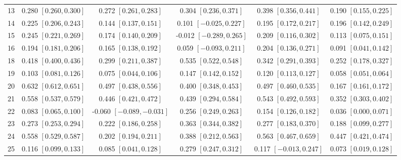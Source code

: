 \begin{landscape}
\begin{longtable}{lccccc}
13 & 0.280 {\scriptsize$[0.260,0.300]$} & 0.272 {\scriptsize$[0.261,0.283]$} & 0.304 {\scriptsize$[0.236,0.371]$} & 0.398 {\scriptsize$[0.356,0.441]$} & 0.190 {\scriptsize$[0.155,0.225]$} \\
14 & 0.225 {\scriptsize$[0.206,0.243]$} & 0.144 {\scriptsize$[0.137,0.151]$} & 0.101 {\scriptsize$[-0.025,0.227]$} & 0.195 {\scriptsize$[0.172,0.217]$} & 0.196 {\scriptsize$[0.142,0.249]$} \\
15 & 0.245 {\scriptsize$[0.221,0.269]$} & 0.174 {\scriptsize$[0.140,0.209]$} & -0.012 {\scriptsize$[-0.289,0.265]$} & 0.209 {\scriptsize$[0.116,0.302]$} & 0.113 {\scriptsize$[0.075,0.151]$} \\
16 & 0.194 {\scriptsize$[0.181,0.206]$} & 0.165 {\scriptsize$[0.138,0.192]$} & 0.059 {\scriptsize$[-0.093,0.211]$} & 0.204 {\scriptsize$[0.136,0.271]$} & 0.091 {\scriptsize$[0.041,0.142]$} \\
18 & 0.418 {\scriptsize$[0.400,0.436]$} & 0.299 {\scriptsize$[0.211,0.387]$} & 0.535 {\scriptsize$[0.522,0.548]$} & 0.342 {\scriptsize$[0.291,0.393]$} & 0.252 {\scriptsize$[0.178,0.327]$} \\
19 & 0.103 {\scriptsize$[0.081,0.126]$} & 0.075 {\scriptsize$[0.044,0.106]$} & 0.147 {\scriptsize$[0.142,0.152]$} & 0.120 {\scriptsize$[0.113,0.127]$} & 0.058 {\scriptsize$[0.051,0.064]$} \\
20 & 0.632 {\scriptsize$[0.612,0.651]$} & 0.497 {\scriptsize$[0.438,0.556]$} & 0.400 {\scriptsize$[0.348,0.453]$} & 0.497 {\scriptsize$[0.460,0.535]$} & 0.167 {\scriptsize$[0.161,0.172]$} \\
21 & 0.558 {\scriptsize$[0.537,0.579]$} & 0.446 {\scriptsize$[0.421,0.472]$} & 0.439 {\scriptsize$[0.294,0.584]$} & 0.543 {\scriptsize$[0.492,0.593]$} & 0.352 {\scriptsize$[0.303,0.402]$} \\
22 & 0.083 {\scriptsize$[0.065,0.100]$} & -0.060 {\scriptsize$[-0.089,-0.031]$} & 0.256 {\scriptsize$[0.249,0.263]$} & 0.154 {\scriptsize$[0.126,0.182]$} & 0.036 {\scriptsize$[0.000,0.071]$} \\
23 & 0.273 {\scriptsize$[0.253,0.294]$} & 0.222 {\scriptsize$[0.186,0.258]$} & 0.363 {\scriptsize$[0.344,0.382]$} & 0.277 {\scriptsize$[0.183,0.370]$} & 0.188 {\scriptsize$[0.099,0.277]$} \\
24 & 0.558 {\scriptsize$[0.529,0.587]$} & 0.202 {\scriptsize$[0.194,0.211]$} & 0.388 {\scriptsize$[0.212,0.563]$} & 0.563 {\scriptsize$[0.467,0.659]$} & 0.447 {\scriptsize$[0.421,0.474]$} \\
25 & 0.116 {\scriptsize$[0.099,0.133]$} & 0.085 {\scriptsize$[0.041,0.128]$} & 0.279 {\scriptsize$[0.247,0.312]$} & 0.117 {\scriptsize$[-0.013,0.247]$} & 0.073 {\scriptsize$[0.019,0.128]$} \\

\end{longtable}
\end{landscape}
